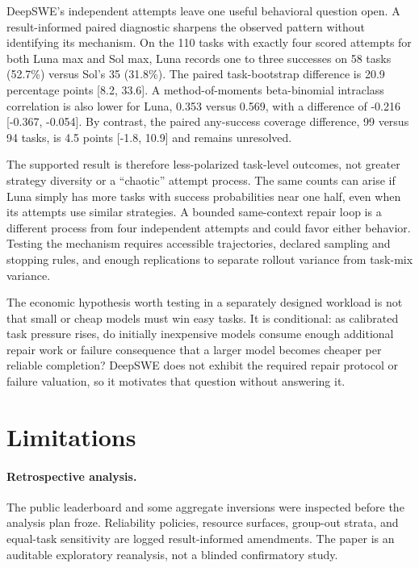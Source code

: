 \documentclass[11pt]{article}
\begin{document}
DeepSWE's independent attempts leave one useful behavioral question open. A result-informed paired
diagnostic sharpens the observed pattern without identifying its mechanism. On the 110 tasks with
exactly four scored attempts for both Luna max and Sol max, Luna records one to three successes on
58 tasks (52.7\%) versus Sol's 35 (31.8\%). The paired task-bootstrap difference is 20.9 percentage
points [8.2, 33.6]. A method-of-moments beta-binomial intraclass correlation is also lower for Luna,
0.353 versus 0.569, with a difference of -0.216 [-0.367, -0.054]. By contrast, the paired
any-success coverage difference, 99 versus 94 tasks, is 4.5 points [-1.8, 10.9] and remains
unresolved.

The supported result is therefore less-polarized task-level outcomes, not greater strategy
diversity or a ``chaotic'' attempt process. The same counts can arise if Luna simply has more tasks
with success probabilities near one half, even when its attempts use similar strategies. A bounded
same-context repair loop is a different process from four independent attempts and could favor
either behavior. Testing the mechanism requires accessible trajectories, declared sampling and
stopping rules, and enough replications to separate rollout variance from task-mix variance.

The economic hypothesis worth testing in a separately designed workload is not that small or cheap
models must win easy tasks. It is conditional: as calibrated task pressure rises, do initially
inexpensive models consume enough additional repair work or failure consequence that a larger model
becomes cheaper per reliable completion? DeepSWE does not exhibit the required repair protocol or
failure valuation, so it motivates that question without answering it.

\section{Limitations}

\paragraph{Retrospective analysis.}
The public leaderboard and some aggregate inversions were inspected before the analysis plan froze.
Reliability policies, resource surfaces, group-out strata, and equal-task sensitivity are logged
result-informed amendments. The paper is an auditable exploratory reanalysis, not a blinded
confirmatory study.
\end{document}
